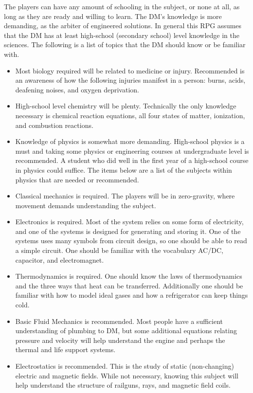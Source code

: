 \documentclass[a4paper]{article}
\begin{document}
The players can have any amount of schooling in the subject, or none at all, as long as they are ready and willing to learn. The DM's knowledge is more demanding, as the arbiter of engineered solutions. In general this RPG assumes that the DM has at least high-school (secondary school) level knowledge in the sciences. The following is a list of topics that the DM should know or be familiar with.
\begin{itemize}
\item Most biology required will be related to medicine or injury. Recommended is an awareness of how the following injuries manifest in a person: burns, acids, deafening noises, and oxygen deprivation.
\item High-school level chemistry will be plenty. Technically the only knowledge necessary is chemical reaction equations, all four states of matter, ionization, and combustion reactions.
\item Knowledge of physics is somewhat more demanding. High-school physics is a must and taking some physics or engineering courses at undergraduate level is recommended. A student who did well in the first year of a high-school course in physics could suffice. The items below are a list of the subjects within physics that are needed or recommended. 
\item Classical mechanics is required. The players will be in zero-gravity, where movement demands understanding the subject.
\item Electronics is required. Most of the system relies on some form of electricity, and one of the systems is designed for generating and storing it. One of the systems uses many symbols from circuit design, so one should be able to read a simple circuit. One should be familiar with the vocabulary AC/DC, capacitor, and electromagnet.
\item Thermodynamics is required. One should know the laws of thermodynamics and the three ways that heat can be transferred. Additionally one should be familiar with how to model ideal gases and how a refrigerator can keep things cold.
\item Basic Fluid Mechanics is recommended. Most people have a sufficient understanding of plumbing to DM, but some additional equations relating pressure and velocity will help understand the engine and perhaps the thermal and life support systems.
\item Electrostatics is recommended. This is the study of static (non-changing) electric and magnetic fields. While not necessary, knowing this subject will help understand the structure of railguns, rays, and magnetic field coils.
\end{itemize}
\end{document}
